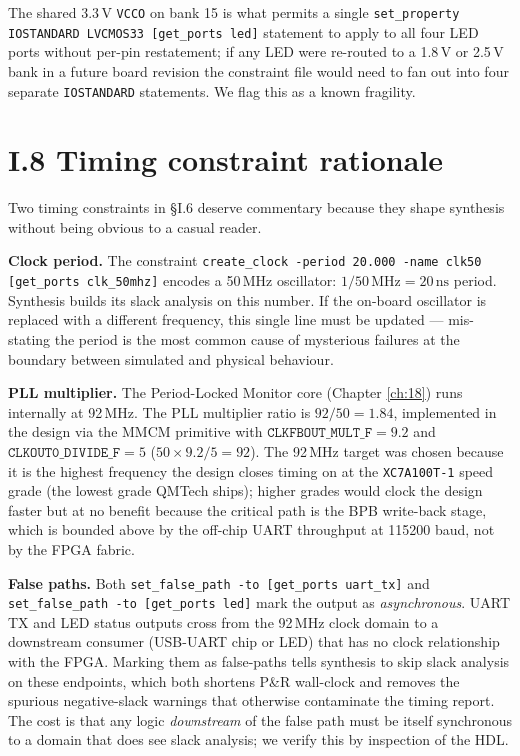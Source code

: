The shared 3.3\,V \texttt{VCCO} on bank 15 is what permits a single
\texttt{set\_property IOSTANDARD LVCMOS33 [get\_ports led]} statement
to apply to all four LED ports without per-pin restatement; if any LED
were re-routed to a 1.8\,V or 2.5\,V bank in a future board revision
the constraint file would need to fan out into four separate
\texttt{IOSTANDARD} statements. We flag this as a known fragility.

\section*{I.8 Timing constraint rationale}
\label{sec:appI-timing}

Two timing constraints in \S I.6 deserve commentary because they shape
synthesis without being obvious to a casual reader.

\textbf{Clock period.} The constraint
\texttt{create\_clock -period 20.000 -name clk50 [get\_ports clk\_50mhz]}
encodes a 50\,MHz oscillator: $1 / 50\,\text{MHz} = 20\,\text{ns}$
period. Synthesis builds its slack analysis on this number. If the
on-board oscillator is replaced with a different frequency, this single
line must be updated --- mis-stating the period is the most common cause
of mysterious failures at the boundary between simulated and physical
behaviour.

\textbf{PLL multiplier.} The Period-Locked Monitor core (Chapter
\ref{ch:18}) runs internally at 92\,MHz. The PLL multiplier ratio is
$92 / 50 = 1.84$, implemented in the design via the MMCM primitive with
$\texttt{CLKFBOUT\_MULT\_F} = 9.2$ and $\texttt{CLKOUT0\_DIVIDE\_F} = 5$
($50 \times 9.2 / 5 = 92$). The 92\,MHz target was chosen because it is
the highest frequency the design closes timing on at the
\texttt{XC7A100T-1} speed grade (the lowest grade QMTech ships); higher
grades would clock the design faster but at no benefit because the
critical path is the BPB write-back stage, which is bounded above by
the off-chip UART throughput at 115200 baud, not by the FPGA fabric.

\textbf{False paths.} Both \texttt{set\_false\_path -to [get\_ports uart\_tx]}
and \texttt{set\_false\_path -to [get\_ports led]} mark the output as
\emph{asynchronous}. UART TX and LED status outputs cross from the 92\,MHz
clock domain to a downstream consumer (USB-UART chip or LED) that has no
clock relationship with the FPGA. Marking them as false-paths tells
synthesis to skip slack analysis on these endpoints, which both shortens
P\&R wall-clock and removes the spurious negative-slack warnings that
otherwise contaminate the timing report. The cost is that any logic
\emph{downstream} of the false path must be itself synchronous to a
domain that does see slack analysis; we verify this by inspection of the
HDL.

